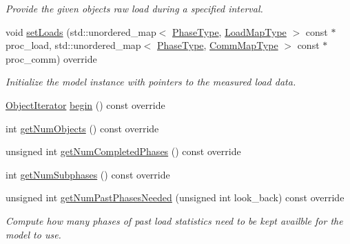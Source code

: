 \begin{DoxyCompactItemize}
\begin{DoxyCompactList}\small\item\em Provide the given object\textquotesingle{}s raw load during a specified interval. \end{DoxyCompactList}\item 
void \hyperlink{structvt_1_1vrt_1_1collection_1_1balance_1_1_raw_data_aa29d4f35b5d3afb4690cef64fb65b887}{set\+Loads} (std\+::unordered\+\_\+map$<$ \hyperlink{namespacevt_a46ce6733d5cdbd735d561b7b4029f6d7}{Phase\+Type}, \hyperlink{namespacevt_1_1vrt_1_1collection_1_1balance_a5339303db2e1ce964d783a53fd74e6b1}{Load\+Map\+Type} $>$ const $\ast$proc\+\_\+load, std\+::unordered\+\_\+map$<$ \hyperlink{namespacevt_a46ce6733d5cdbd735d561b7b4029f6d7}{Phase\+Type}, \hyperlink{namespacevt_1_1vrt_1_1collection_1_1balance_a01ee1fb0ae2da1d2ab7fdca3be9ae351}{Comm\+Map\+Type} $>$ const $\ast$proc\+\_\+comm) override
\begin{DoxyCompactList}\small\item\em Initialize the model instance with pointers to the measured load data. \end{DoxyCompactList}\item 
\hyperlink{structvt_1_1vrt_1_1collection_1_1balance_1_1_object_iterator}{Object\+Iterator} \hyperlink{structvt_1_1vrt_1_1collection_1_1balance_1_1_raw_data_acfe356d51313995dacf50868f3fac19b}{begin} () const override
\item 
int \hyperlink{structvt_1_1vrt_1_1collection_1_1balance_1_1_raw_data_af52829981fa8aec26ac5cfc0a2d29cce}{get\+Num\+Objects} () const override
\item 
unsigned int \hyperlink{structvt_1_1vrt_1_1collection_1_1balance_1_1_raw_data_afc5ca3584a08924a4c5941b32aebb35e}{get\+Num\+Completed\+Phases} () const override
\item 
int \hyperlink{structvt_1_1vrt_1_1collection_1_1balance_1_1_raw_data_a252d51c7265f225736068a4ae87b4a0a}{get\+Num\+Subphases} () const override
\item 
unsigned int \hyperlink{structvt_1_1vrt_1_1collection_1_1balance_1_1_raw_data_ad81a96c22f81405e93bf162e6aafbeed}{get\+Num\+Past\+Phases\+Needed} (unsigned int look\+\_\+back) const override
\begin{DoxyCompactList}\small\item\em Compute how many phases of past load statistics need to be kept availble for the model to use. \end{DoxyCompactList}\end{DoxyCompactItemize}
